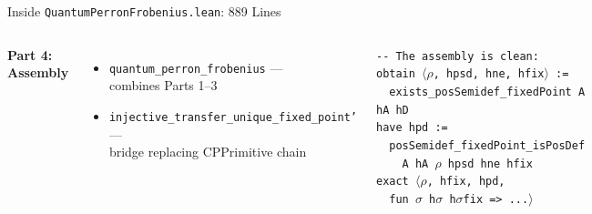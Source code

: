 \documentclass[aspectratio=169,10pt]{beamer}
\begin{document}
\begin{frame}[fragile]{Inside \texttt{QuantumPerronFrobenius.lean}: 889 Lines}
\begin{columns}[T]
        \vspace{0.3em}
        \textbf{Part 4: Assembly}
        \begin{itemize}\itemsep0.05em\scriptsize
            \item \texttt{quantum\_perron\_frobenius} --- \\
                combines Parts 1--3
            \item \texttt{injective\_transfer\_unique\_fixed\_point'} --- \\
                bridge replacing CPPrimitive chain
        \end{itemize}

        \vspace{0.5em}
        \vspace{0.2em}
        {\ttfamily\tiny\color{white}
        \colorbox{cardbg}{\parbox{0.42\textwidth}{%
        \texttt{-{}- The assembly is clean:}\\
        \texttt{obtain $\langle\rho$, hpsd, hne, hfix$\rangle$ :=}\\
        \texttt{~~exists\_posSemidef\_fixedPoint A hA hD}\\
        \texttt{have hpd :=}\\
        \texttt{~~posSemidef\_fixedPoint\_isPosDef}\\
        \texttt{~~~~A hA $\rho$ hpsd hne hfix}\\
        \texttt{exact $\langle\rho$, hfix, hpd,}\\
        \texttt{~~fun $\sigma$ h$\sigma$ h$\sigma$fix => ...$\rangle$}
        }}}
    \end{columns}
\end{frame}
\end{document}
